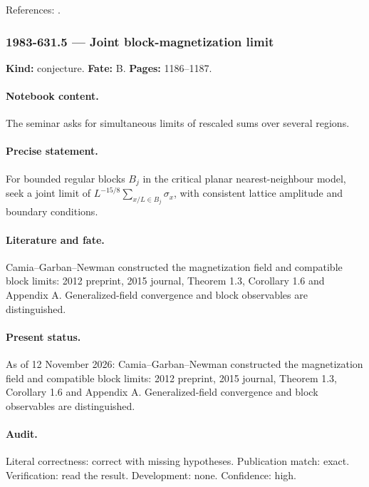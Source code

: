 \noindent References: \citep{onsager1944crystal,wumccoytracybarouch1976ising}.\par

\subsubsection{1983-631.5 --- Joint block-magnetization limit}

\label{item:1983-631.5}

\noindent\textbf{Kind:} conjecture. \textbf{Fate:} B. \textbf{Pages:} 1186--1187.\par

\paragraph{Notebook content.} The seminar asks for simultaneous limits of rescaled sums over several regions.

\paragraph{Precise statement.} For bounded regular blocks \(B_j\) in the critical planar nearest-neighbour model, seek a joint limit of \(L^{-15/8}\sum_{x/L\in B_j}\sigma_x\), with consistent lattice amplitude and boundary conditions.

\paragraph{Literature and fate.} Camia--Garban--Newman constructed the magnetization field and compatible block limits: 2012 preprint, 2015 journal, Theorem 1.3, Corollary 1.6 and Appendix A. Generalized-field convergence and block observables are distinguished.

\paragraph{Present status.} As of 12 November 2026: Camia--Garban--Newman constructed the magnetization field and compatible block limits: 2012 preprint, 2015 journal, Theorem 1.3, Corollary 1.6 and Appendix A. Generalized-field convergence and block observables are distinguished.

\paragraph{Audit.} Literal correctness: correct with missing hypotheses. Publication match: exact. Verification: read the result. Development: none. Confidence: high.

